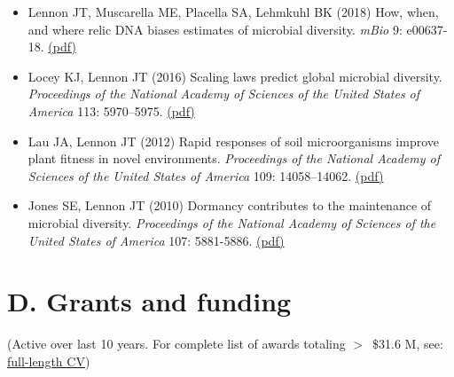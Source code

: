 \documentclass[11pt]{article}  %
\begin{document}
\begin{itemize}[leftmargin=*, label={}, itemsep=1em]
\item Lennon JT, Muscarella ME, Placella SA, Lehmkuhl BK (2018) How, when, and where relic DNA biases estimates of microbial diversity. \textit{mBio} 9: e00637-18. \href{https://lennonlab.github.io/assets/publications/Lennon_etal_2018.pdf}{(pdf)}

\item Locey KJ, Lennon JT (2016) Scaling laws predict global microbial diversity. \textit{Proceedings of the National Academy of Sciences of the United States of America} 113: 5970–5975. \href{https://lennonlab.github.io/assets/publications/Locey_Lennon_2016.pdf}{(pdf)}

\item Lau JA, Lennon JT (2012) Rapid responses of soil microorganisms improve plant fitness in novel environments. \textit{Proceedings of the National Academy of Sciences of the United States of America} 109: 14058–14062. \href{https://lennonlab.github.io/assets/publications/Lau_Lennon_2012.pdf}{(pdf)}

\item Jones SE, Lennon JT (2010) Dormancy contributes to the maintenance of microbial diversity. \textit{Proceedings of the National Academy of Sciences of the United States of America} 107: 5881-5886. \href{https://lennonlab.github.io/assets/publications/Jones_Lennon_2010.pdf}{(pdf)}

\end{itemize}

\vspace{0.5 em} %
\section*{D. Grants and funding}

(Active over last 10 years. For complete list of awards totaling $>$~\$31.6 M, see: \href{https://lennonlab.github.io/assets/docs/Lennon_CV.pdf}{full-length CV})
\end{document}
